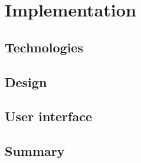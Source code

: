 \chapter{Implementation}
\label{chap:implementation}

\section{Technologies}




\section{Design}
\section{User interface}
\section{Summary}
